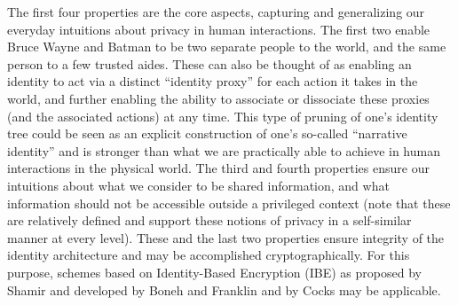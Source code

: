 \documentclass[pra,twocolumn,groupedaddress,10pt]{revtex4}
\theoremstyle{definition}
\begin{document}
The first four properties are the core aspects, capturing and generalizing our everyday intuitions about privacy in human interactions. The first two enable Bruce Wayne and Batman to be two separate people to the world, and the same person to a few trusted aides. These can also be thought of as enabling an identity to act via a distinct ``identity proxy'' for each action it takes in the world, and further enabling the ability to associate or dissociate these proxies (and the associated actions) at any time. This type of pruning of one's identity tree could be seen as an explicit construction of one's so-called ``narrative identity''\cite{narrativeidentity} and is stronger than what we are practically able to achieve in human interactions in the physical world. The third and fourth properties ensure our intuitions about what we consider to be shared information, and what information should not be accessible outside a privileged context (note that these are relatively defined and support these notions of privacy in a self-similar manner at every level). These and the last two properties ensure integrity of the identity architecture and may be accomplished cryptographically. For this purpose, schemes based on Identity-Based Encryption (IBE) as proposed by Shamir\cite{shamir} and developed by Boneh and Franklin\cite{boneh} and by Cocks\cite{cocks} may be applicable.
\end{document}
